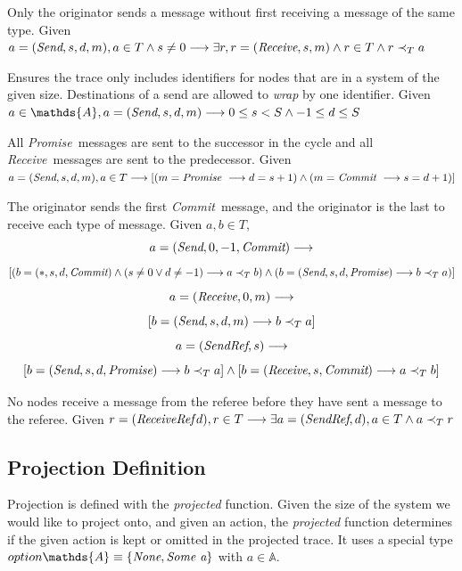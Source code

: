 \documentclass[runningheads]{llncs}
\newcommand{\send}{\emph{Send}}
\newcommand{\receive}{\emph{Receive}}
\newcommand{\sendref}{\emph{SendRef}}
\newcommand{\receiveref}{\emph{ReceiveRef}}
\newcommand{\action}{\mathds{A}}
\newcommand{\promise}{\emph{Promise}}
\newcommand{\commit}{\emph{Commit}}
\newcommand{\happensbefore}{\prec_T}
\begin{document}
\begin{definition} Only the originator sends a message without first receiving a message of the same type.
Given $a = (\send, s, d, m), a \in T \wedge s \neq 0 \longrightarrow \exists r, r = (\receive, s, m) \wedge r \in T \wedge r \happensbefore a$
\end{definition}

\begin{definition} Ensures the trace only includes identifiers for nodes that are in a system of the given size. Destinations of a send are allowed to \emph{wrap} by one identifier. Given $a \in \action, a = (\send, s, d, m) \longrightarrow 0 \le s < S \wedge -1 \le d \le S$
\end{definition}

\begin{definition} All \promise\ messages are sent to the successor in the cycle and all \receive\ messages are sent to the predecessor. Given $a = (\send, s, d, m), a \in T \longrightarrow [(m = \promise\ \longrightarrow d = s + 1) \wedge (m = \commit\ \longrightarrow s = d + 1)]$
\end{definition}
\begin{definition} The originator sends the first \commit\ message, and the originator is the last to receive each type of message. Given $a, b \in T$,
$$ 
a = (\send, 0, -1, \commit) \longrightarrow 
$$
$$
[
(b = (*, s, d, \commit) \wedge (s \neq 0 \vee d \neq -1) \longrightarrow a \happensbefore b)
\wedge 
(b = (\send, s, d, \promise) \longrightarrow b \happensbefore a)
]
$$
$$
a = (\receive, 0, m) \longrightarrow 
$$
$$
[
b = (\send, s, d, m) \longrightarrow b \happensbefore a
]
$$
$$
a = (\sendref, s) \longrightarrow 
$$
$$
[
b = (\send, s, d, \promise) \longrightarrow b \happensbefore a
]
\wedge
[
b = (\receive, s, \commit) \longrightarrow a \happensbefore b
]
$$
\end{definition}
\begin{definition} No nodes receive a message from the referee before they have sent a message to the referee. Given $r = (\receiveref\, d), r \in T \longrightarrow \exists a = (\sendref, d), a \in T \wedge a \happensbefore r$
\end{definition}


\subsection{Projection Definition}
\label{sec:projection}
Projection is defined with the \emph{projected} function. Given the size of the system we would like to project onto, and given an action, the \emph{projected} function determines if the given action is kept or omitted in the projected trace. It uses a special type  
$option \action \equiv \{\emph{None}, \emph{Some a}\}$ with $a \in \action$.
\end{document}

